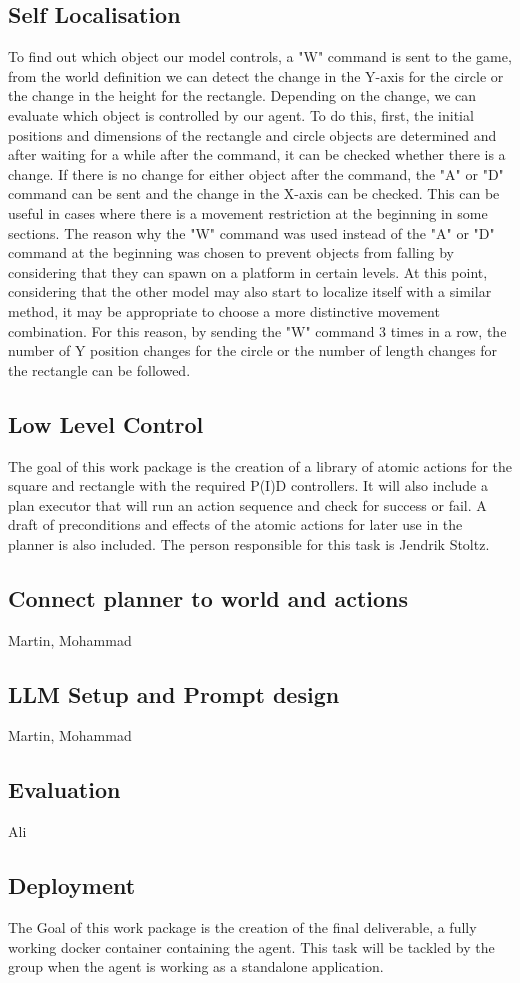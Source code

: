 \documentclass{article}
\begin{document}
\subsection{Self Localisation}
To find out which object our model controls, a "W" command is sent to the game, from the world definition we can detect the change in the Y-axis for the circle or the change in the height for the rectangle. Depending on the change, we can evaluate which object is controlled by our agent. To do this, first, the initial positions and dimensions of the rectangle and circle objects are determined and after waiting for a while after the command, it can be checked whether there is a change. If there is no change for either object after the command, the "A" or "D" command can be sent and the change in the X-axis can be checked. This can be useful in cases where there is a movement restriction at the beginning in some sections. The reason why the "W" command was used instead of the "A" or "D" command at the beginning was chosen to prevent objects from falling by considering that they can spawn on a platform in certain levels. At this point, considering that the other model may also start to localize itself with a similar method, it may be appropriate to choose a more distinctive movement combination. For this reason, by sending the "W" command 3 times in a row, the number of Y position changes for the circle or the number of length changes for the rectangle can be followed.

\subsection{Low Level Control}
The goal of this work package is the creation of a library of atomic actions for the square and rectangle with the required P(I)D controllers. It will also include a plan executor that will run an action sequence and check for success or fail.
A draft of preconditions and effects of the atomic actions for later use in the planner is also included. The person responsible for this task is Jendrik Stoltz.

\subsection{Connect planner to world and actions}
Martin, Mohammad

\subsection{LLM Setup and Prompt design}
Martin, Mohammad

\subsection{Evaluation}
Ali

\subsection{Deployment}
The Goal of this work package is the creation of the final deliverable, a fully working docker container containing the agent. 
This task will be tackled by the group when the agent is working as a standalone application.
\end{document}
